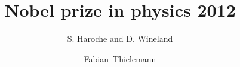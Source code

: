 \documentclass[english]{beamer}
\title[Nobelprize 2012]{Nobel prize in physics 2012}
\subtitle{S. Haroche and D. Wineland}
\author[F.~Thielemann]{Fabian~Thielemann}
\institute{Institute of Physics}
\newcommand{\backupbegin}{
   \newcounter{framenumberappendix}
   \setcounter{framenumberappendix}{\value{framenumber}}
}
\newcommand{\backupend}{
  \addtocounter{framenumberappendix}{-\value{framenumber}}
  \addtocounter{framenumber}{\value{framenumberappendix}} 
}
\begin{document}
  \begin{frame}[t]
    \titlepage
  \end{frame}

  
\end{document}
